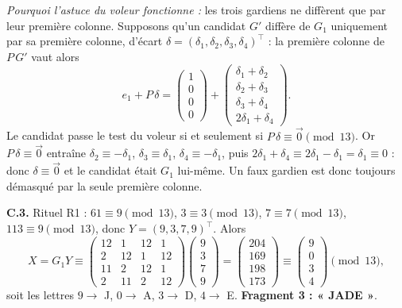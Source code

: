 \documentclass[11pt,a4paper]{article}
\begin{document}
	\emph{Pourquoi l'astuce du voleur fonctionne :} les trois gardiens ne
	diffèrent que par leur première colonne. Supposons qu'un candidat $G'$
	diffère de $G_1$ uniquement par sa première colonne, d'écart
	$\delta = (\delta_1,\delta_2,\delta_3,\delta_4)^{\!\top}$ : la première
	colonne de $P\,G'$ vaut alors
	\[
	e_1 + P\,\delta
	= \begin{pmatrix}1\\0\\0\\0\end{pmatrix}
	+ \begin{pmatrix}\delta_1+\delta_2\\ \delta_2+\delta_3\\
		\delta_3+\delta_4\\ 2\delta_1+\delta_4\end{pmatrix}.
	\]
	Le candidat passe le test du voleur si et seulement si $P\,\delta \equiv
	\vec{0} \pmod{13}$. Or $P\,\delta \equiv \vec{0}$ entraîne
	$\delta_2 \equiv -\delta_1$, $\delta_3 \equiv \delta_1$,
	$\delta_4 \equiv -\delta_1$, puis
	$2\delta_1 + \delta_4 \equiv 2\delta_1 - \delta_1 = \delta_1 \equiv 0$ :
	donc $\delta \equiv \vec{0}$ et le candidat était $G_1$ lui-même. Un faux
	gardien est donc toujours démasqué par la seule première colonne.
	
	\textbf{C.3.} Rituel R1 : $61 \equiv 9 \pmod{13}$,
	$3 \equiv 3 \pmod{13}$, $7 \equiv 7 \pmod{13}$,
	$113 \equiv 9 \pmod{13}$, donc $Y = (9,3,7,9)^{\!\top}$.
	Alors
	\[
	X = G_1 Y \equiv \begin{pmatrix}
		12&1&12&1\\2&12&1&12\\11&2&12&1\\2&11&2&12
	\end{pmatrix}
	\begin{pmatrix}9\\3\\7\\9\end{pmatrix}
	= \begin{pmatrix}204\\169\\198\\173\end{pmatrix}
	\equiv \begin{pmatrix}9\\0\\3\\4\end{pmatrix} \pmod{13},
	\]
	soit les lettres $9 \to$ J, $0 \to$ A, $3 \to$ D, $4 \to$ E.
	\textbf{Fragment 3 : « JADE »}.
	
\end{document}
